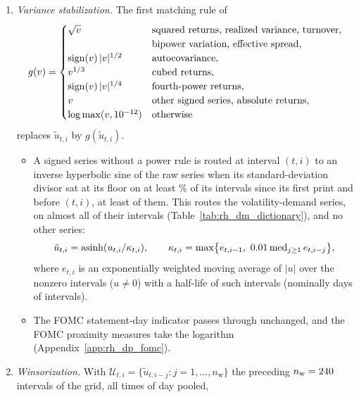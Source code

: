 \begin{enumerate}
\begin{itemize}
  \item the implied volatility indices, the StockTwits sentiment score and the FOMC series are not adjusted.
  \end{itemize}
\item \emph{Variance stabilization.} The first matching rule of
  \[
    g(v) =
    \begin{cases}
      \sqrt{v} & \text{squared returns, realized variance, turnover,}\\
        & \text{bipower variation, effective spread},\\
      \operatorname{sign}(v)\,|v|^{1/2} & \text{autocovariance},\\
      v^{1/3} & \text{cubed returns},\\
      \operatorname{sign}(v)\,|v|^{1/4} & \text{fourth-power returns},\\
      v & \text{other signed series, absolute returns},\\
      \log \max(v, 10^{-12}) & \text{otherwise}
    \end{cases}
  \]
  replaces $\tilde u_{t,i}$ by $g(\tilde u_{t,i})$.
  \begin{itemize}
  \item A signed series without a power rule is routed at interval $(t,i)$ to an inverse hyperbolic sine of the raw
    series when its standard-deviation divisor sat at its floor on at least \rhdmAsinhPinnedShare\% of its intervals
    since its first print and before $(t,i)$, at least \rhdmAsinhMinRows{} of them. This routes the volatility-demand
    series, on almost all of their intervals (Table~\ref{tab:rh_dm_dictionary}), and no other series:
    \[
      \tilde u_{t,i} = \operatorname{asinh}(u_{t,i} / \kappa_{t,i}), \qquad
      \kappa_{t,i} = \max\bigl\{ e_{t,i-1},\ 0.01 \operatorname{med}_{j \ge 1} e_{t,i-j} \bigr\},
    \]
    where $e_{t,i}$ is an exponentially weighted moving average of $|u|$ over the nonzero intervals ($u \ne 0$) with
    a half-life of \rhdmAsinhHalfLife{} such intervals (nominally \rhdmAsinhHalfLifeDays{} days of \rhdmNIntervals{}
    intervals).
  \item The FOMC statement-day indicator passes through unchanged, and the FOMC proximity measures take the logarithm
    (Appendix~\ref{app:rh_dp_fomc}).
  \end{itemize}
\item \emph{Winsorization.} With $\mathcal U_{t,i} = \{\tilde u_{t,i-j} : j = 1, \dots, n_{\mathrm{w}}\}$ the
  preceding $n_{\mathrm{w}} = 240$ intervals of the grid, all times of day pooled,

\end{enumerate}
